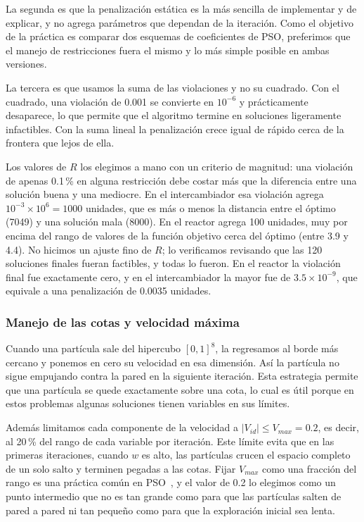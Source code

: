 La segunda es que la penalización estática es la más sencilla de implementar y de explicar, y no agrega parámetros que dependan de la iteración. Como el objetivo de la práctica es comparar dos esquemas de coeficientes de PSO, preferimos que el manejo de restricciones fuera el mismo y lo más simple posible en ambas versiones.

La tercera es que usamos la suma de las violaciones y no su cuadrado. Con el cuadrado, una violación de 0.001 se convierte en $10^{-6}$ y prácticamente desaparece, lo que permite que el algoritmo termine en soluciones ligeramente infactibles. Con la suma lineal la penalización crece igual de rápido cerca de la frontera que lejos de ella.

Los valores de $R$ los elegimos a mano con un criterio de magnitud: una violación de apenas 0.1\,\% en alguna restricción debe costar más que la diferencia entre una solución buena y una mediocre. En el intercambiador esa violación agrega $10^{-3} \times 10^6 = 1000$ unidades, que es más o menos la distancia entre el óptimo (7049) y una solución mala (8000). En el reactor agrega 100 unidades, muy por encima del rango de valores de la función objetivo cerca del óptimo (entre 3.9 y 4.4). No hicimos un ajuste fino de $R$; lo verificamos revisando que las 120 soluciones finales fueran factibles, y todas lo fueron. En el reactor la violación final fue exactamente cero, y en el intercambiador la mayor fue de $3.5 \times 10^{-9}$, que equivale a una penalización de 0.0035 unidades.

\subsubsection{Manejo de las cotas y velocidad máxima}

Cuando una partícula sale del hipercubo $[0,1]^8$, la regresamos al borde más cercano y ponemos en cero su velocidad en esa dimensión. Así la partícula no sigue empujando contra la pared en la siguiente iteración. Esta estrategia permite que una partícula se quede exactamente sobre una cota, lo cual es útil porque en estos problemas algunas soluciones tienen variables en sus límites.

Además limitamos cada componente de la velocidad a $|V_{id}| \le V_{max} = 0.2$, es decir, al 20\,\% del rango de cada variable por iteración. Este límite evita que en las primeras iteraciones, cuando $w$ es alto, las partículas crucen el espacio completo de un solo salto y terminen pegadas a las cotas. Fijar $V_{max}$ como una fracción del rango es una práctica común en PSO~\cite{eberhart2000comparing}, y el valor de 0.2 lo elegimos como un punto intermedio que no es tan grande como para que las partículas salten de pared a pared ni tan pequeño como para que la exploración inicial sea lenta.

